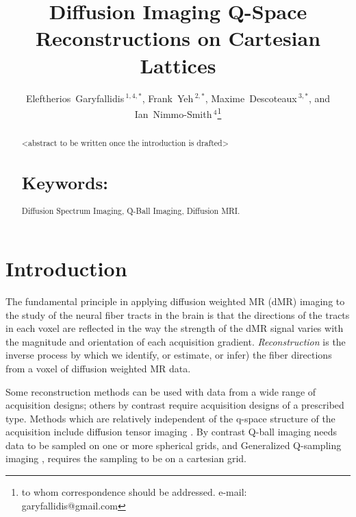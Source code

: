 \documentclass{bioinfo}
\begin{document}

\title[EIT]{Diffusion Imaging Q-Space Reconstructions on Cartesian Lattices}

\author[Garyfallidis, Yeh and
Nimmo-Smith]{Eleftherios~Garyfallidis\,$^{1,4,*}$, Frank~Yeh\,$^{2,*}$, Maxime~Descoteaux\,$^{3,*}$, and
  Ian~Nimmo-Smith\,$^{4}$\footnote{to whom correspondence should be
    addressed. e-mail: garyfallidis@gmail.com}}

\address{\,$^{1}$Wolfson College, University of Cambridge, Cambridge, UK\\
  \,$^{2}$Carnegie~Mellon, Pittsburgh.\\
  \,$^{3}$University of Sherbrooke, Canada.\\
  \,$^{4}$MRC Cognition and Brain Sciences Unit, Cambridge, UK.\\}

\history{}

\editor{}

\maketitle

\begin{abstract}
\noindent

<abstract to be written once the introduction is drafted>

\section{Keywords:} Diffusion Spectrum Imaging, Q-Ball Imaging,
Diffusion MRI.

\end{abstract}

\section{Introduction}

The fundamental principle in applying diffusion weighted MR (dMR)
imaging to the study of the neural fiber tracts in the brain is that the
directions of the tracts in each voxel are reflected in the way the
strength of the dMR signal varies with the magnitude and orientation of
each acquisition gradient.  \emph{Reconstruction} is the inverse process
by which we identify, or estimate, or infer) the fiber directions from a
voxel of diffusion weighted MR data. 

Some reconstruction methods can be used with data from a wide range of
acquisition designs; others by contrast require acquisition designs of a
prescribed type. Methods which are relatively independent of the q-space
structure of the acquisition include diffusion tensor imaging
\citep*[DTI;][]{Basser1994BiophysicalJ}. By contrast Q-ball imaging
\citep*[QBI;][]{Tuch2004} needs data to be sampled on one or more spherical
grids, and Generalized Q-sampling imaging \citep*[GQI;][]{Yeh2010},
requires the sampling to be on a cartesian grid.
\end{document}
